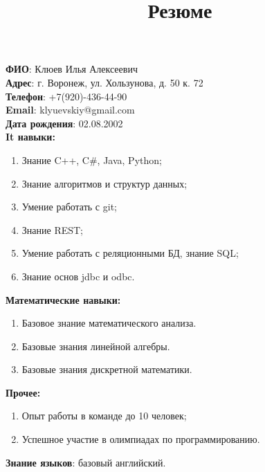 \documentclass[14pt,a4paper]{article}
\title{Резюме}
\begin{document}
	\maketitle
	\noindent\textbf{ФИО}: Клюев Илья Алексеевич\\
	\textbf{Адрес}: г. Воронеж, ул. Хользунова, д. 50 к. 72\\
	\textbf{Телефон}: +7(920)-436-44-90\\
	\textbf{Email}: klyuevskiy@gmail.com\\
	\textbf{Дата рождения}: 02.08.2002\\
	\textbf{It навыки:}
	\begin{enumerate}
		\item Знание C++, C\#, Java, Python;
		\item Знание алгоритмов и структур данных;
		\item Умение работать с git;
		\item Знание REST;
		\item Умение работать с реляционными БД, знание SQL;
		\item Знание основ jdbc и odbc.
	\end{enumerate}
	\textbf{Математические навыки:}
	\begin{enumerate}
		\item Базовое знание математического анализа.
		\item Базовые знания линейной алгебры.
		\item Базовые знания дискретной математики.
	\end{enumerate}
	\textbf{Прочее:}
	\begin{enumerate}
		\item Опыт работы в команде до 10 человек;
		\item Успешное участие в олимпиадах по программированию.
	\end{enumerate}
	\textbf{Знание языков}: базовый английский.
\end{document}
